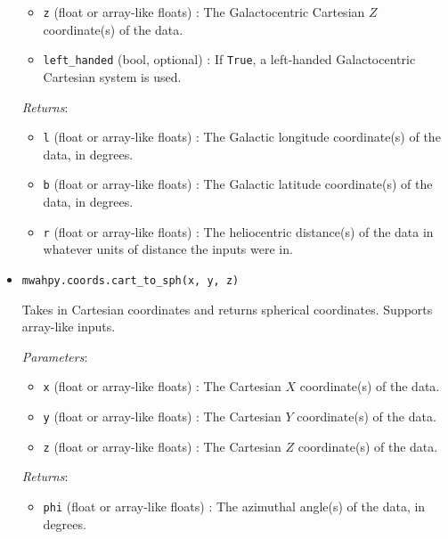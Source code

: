\documentclass{article}
\begin{document}
\begin{itemize}
\begin{itemize}
\item \verb!z! (float or array-like floats) : The Galactocentric Cartesian $Z$ coordinate(s) of the data.

\item \verb!left_handed! (bool, optional) : If \verb!True!, a left-handed Galactocentric Cartesian system is used.

\end{itemize}

\textit{Returns}: \begin{itemize}

\item \verb!l! (float or array-like floats) : The Galactic longitude coordinate(s) of the data, in degrees.

\item \verb!b! (float or array-like floats) : The Galactic latitude coordinate(s) of the data, in degrees.

\item \verb!r! (float or array-like floats) : The heliocentric distance(s) of the data in whatever units of distance the inputs were in.

\end{itemize}



\item \verb!mwahpy.coords.cart_to_sph(x, y, z)!

Takes in Cartesian coordinates and returns spherical coordinates. Supports array-like inputs.

\textit{Parameters}: \begin{itemize}

\item \verb!x! (float or array-like floats) : The Cartesian $X$ coordinate(s) of the data.

\item \verb!y! (float or array-like floats) : The Cartesian $Y$ coordinate(s) of the data.

\item \verb!z! (float or array-like floats) : The Cartesian $Z$ coordinate(s) of the data.

\end{itemize}

\textit{Returns}: \begin{itemize}

\item \verb!phi! (float or array-like floats) : The azimuthal angle(s) of the data, in degrees.


\end{itemize}
\end{itemize}
\end{document}
